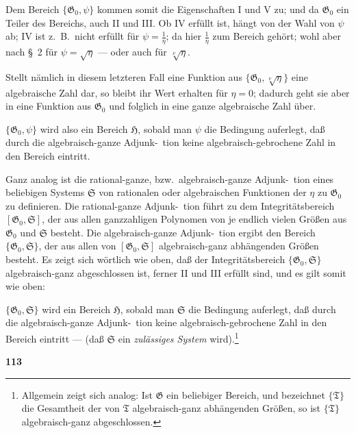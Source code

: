 \documentclass[12pt,a4paper]{article}
\begin{document}
Dem Bereich $\{\mathfrak{G}_0, \psi\}$ kommen somit die Eigenschaften I und V zu; und da $\mathfrak{G}_0$ ein Teiler des Bereichs, auch II und III. Ob IV erf\"ullt ist, h\"angt von der Wahl von $\psi$ ab; IV ist z.\ B.\ nicht erf\"ullt f\"ur $\psi = \frac{1}{\eta}$; da hier $\frac{1}{\eta}$ zum Bereich geh\"ort; wohl aber nach \S\ 2 f\"ur $\psi = \sqrt{\eta}$ --- oder auch f\"ur $\sqrt[\nu]{\eta}$.

Stellt n\"amlich in diesem letzteren Fall eine Funktion aus $\{\mathfrak{G}_0, \sqrt[\nu]{\eta}\}$ eine algebraische Zahl dar, so bleibt ihr Wert erhalten f\"ur $\eta = 0$; dadurch geht sie aber in eine Funktion aus $\mathfrak{G}_0$ und folglich in eine ganze algebraische Zahl \"uber.

$\{\mathfrak{G}_0, \psi\}$ wird also ein Bereich $\mathfrak{H}$, sobald man $\psi$ die Bedingung auferlegt, da\ss{} durch die algebraisch-ganze Adjunk-\ tion keine algebraisch-gebrochene Zahl in den Bereich eintritt.

Ganz analog ist die rational-ganze, bzw.\ algebraisch-ganze Adjunk-\ tion eines beliebigen Systems $\mathfrak{S}$ von rationalen oder algebraischen Funktionen der $\eta$ zu $\mathfrak{G}_0$ zu definieren. Die rational-ganze Adjunk-\ tion f\"uhrt zu dem Integrit\"atsbereich $[\mathfrak{G}_0, \mathfrak{S}]$, der aus allen ganzzahligen Polynomen von je endlich vielen Gr\"o\ss en aus $\mathfrak{G}_0$ und $\mathfrak{S}$ besteht. Die algebraisch-ganze Adjunk-\ tion ergibt den Bereich $\{\mathfrak{G}_0, \mathfrak{S}\}$, der aus allen von $[\mathfrak{G}_0, \mathfrak{S}]$ algebraisch-ganz abh\"angenden Gr\"o\ss en besteht. Es zeigt sich w\"ortlich wie oben, da\ss{} der Integrit\"atsbereich $\{\mathfrak{G}_0, \mathfrak{S}\}$ algebraisch-ganz abgeschlossen ist, ferner II und III erf\"ullt sind, und es gilt somit wie oben:

$\{\mathfrak{G}_0, \mathfrak{S}\}$ wird ein Bereich $\mathfrak{H}$, sobald man $\mathfrak{S}$ die Bedingung auferlegt, da\ss{} durch die algebraisch-ganze Adjunk-\ tion keine algebraisch-gebrochene Zahl in den Bereich eintritt --- (da\ss{} $\mathfrak{S}$ ein \emph{zul\"assiges System} wird).\footnote{Allgemein zeigt sich analog: Ist $\mathfrak{G}$ ein beliebiger Bereich, und bezeichnet $\{\mathfrak{T}\}$ die Gesamtheit der von $\mathfrak{T}$ algebraisch-ganz abh\"angenden Gr\"o\ss en, so ist $\{\mathfrak{T}\}$ algebraisch-ganz abgeschlossen.}

\newpage
\begin{center}
\textbf{113}
\end{center}
\end{document}
